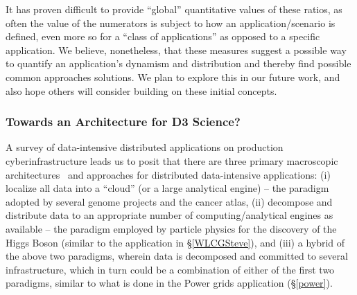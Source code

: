 







It has proven difficult to provide ``global'' quantitative values of
these ratios, as often the value of the numerators is
subject to how an application/scenario is defined, even more so for a
``class of applications'' as opposed to a specific application. We
believe, nonetheless, that these measures suggest a possible way to
quantify an application's dynamism and distribution and thereby find
possible common approaches solutions.  We plan to explore this in our
future work, and also hope others will consider building on these
initial concepts.


\subsubsection{Towards an Architecture for D3 Science?}


A survey of data-intensive distributed applications on production
cyberinfrastructure leads us to posit that there are three primary
macroscopic architectures~\cite{pilot_clouds} and approaches for distributed
data-intensive applications: (i) localize all data into a ``cloud''
(or a large analytical engine) -- the paradigm adopted by several
genome projects and the cancer atlas, (ii) decompose and distribute
data to an appropriate number of computing/analytical engines as
available -- the paradigm employed by particle physics for the
discovery of the Higgs Boson (similar to the application in
\S\ref{WLCGSteve}), and (iii) a hybrid of the above two paradigms,
wherein data is decomposed and committed to several infrastructure,
which in turn could be a combination of either of the first two
paradigms, similar to what is done in the Power grids application
(\S\ref{power}). %

